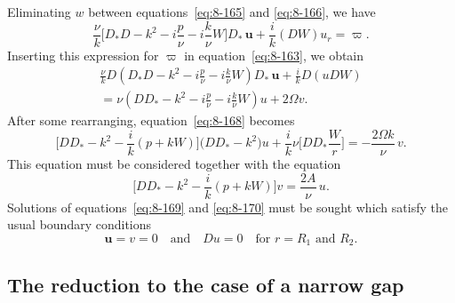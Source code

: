 Eliminating $w$ between equations~\eqref{eq:8-165} and \eqref{eq:8-166}, we have
\begin{equation}
\label{eq:8-167}
\frac{\nu}{k}\biggl[D_*D - k^2 - i\frac{p}{\nu} - i\frac{k}{\nu}W\biggr]D_*\,\mathbf{u} + \frac{i}{k}(DW)u_r = \varpi.
\end{equation}
Inserting this expression for $\varpi$ in equation~\eqref{eq:8-163}, we obtain
\begin{multline}
\label{eq:8-168}
\frac{\nu}{k}D\!\left(D_*D - k^2 - i\frac{p}{\nu} - i\frac{k}{\nu}W\right)D_*\,\mathbf{u} + \frac{i}{k}D(uDW) \\
= \nu\!\left(DD_* - k^2 - i\frac{p}{\nu} - i\frac{k}{\nu}W\right)u + 2\Omega v.
\end{multline}
After some rearranging, equation~\eqref{eq:8-168} becomes
\begin{equation}
\label{eq:8-169}
\biggl[DD_* - k^2 - \frac{i}{k}(p+kW)\biggr]\!\biggl(DD_* - k^2\biggr)u + \frac{i}{k}\nu\biggl[DD_*\frac{W}{r}\biggr] = -\frac{2\Omega k}{\nu}\,v.
\end{equation}
This equation must be considered together with the equation
\begin{equation}
\label{eq:8-170}
\biggl[DD_* - k^2 - \frac{i}{k}(p+kW)\biggr]v = \frac{2A}{\nu}\,u.
\end{equation}
Solutions of equations~\eqref{eq:8-169} and \eqref{eq:8-170} must be sought which satisfy the usual boundary conditions
\begin{equation}
\label{eq:8-171}
\mathbf{u} = v = 0 \quad \text{and} \quad Du = 0 \quad \text{for } r = R_1 \text{ and } R_2.
\end{equation}

\subsection{The reduction to the case of a narrow gap}
\label{sec:79b}

